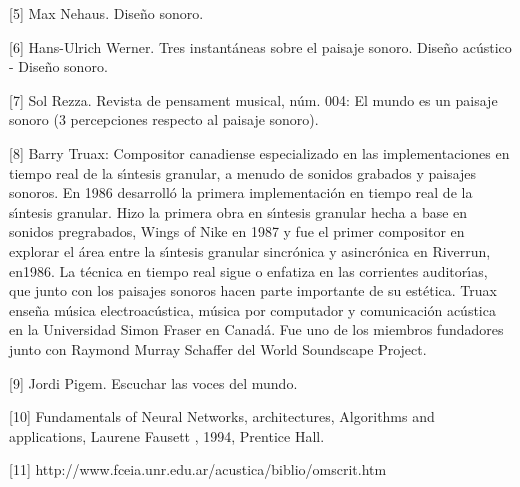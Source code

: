 [5] Max Nehaus. Dise\~{n}o sonoro.

[6] Hans-Ulrich Werner. Tres instant\'{a}neas sobre el paisaje sonoro.
Dise\~{n}o ac\'{u}stico - Dise\~{n}o sonoro.

[7] Sol Rezza. Revista de pensament musical, n\'{u}m. 004: El mundo es un
paisaje sonoro (3 percepciones respecto al paisaje sonoro).

[8] Barry Truax: Compositor canadiense especializado en las implementaciones
en tiempo real de la s\'{\i}ntesis granular, a menudo de sonidos grabados y
paisajes sonoros. En 1986 desarroll\'{o} la primera implementaci\'{o}n en
tiempo real de la s\'{\i}ntesis granular. Hizo la primera obra en
s\'{\i}ntesis granular hecha a base en sonidos pregrabados, Wings of Nike en
1987 y fue el primer compositor en explorar el \'{a}rea entre la s\'{\i}ntesis
granular sincr\'{o}nica y asincr\'{o}nica en Riverrun, en1986. La t\'{e}cnica
en tiempo real sigue o enfatiza en las corrientes auditor\'{\i}as, que junto
con los paisajes sonoros hacen parte importante de su est\'{e}tica. Truax
ense\~{n}a m\'{u}sica electroac\'{u}stica, m\'{u}sica por computador y
comunicaci\'{o}n ac\'{u}stica en la Universidad Simon Fraser en Canad\'{a}.
Fue uno de los miembros fundadores junto con Raymond Murray Schaffer del World
Soundscape Project.

[9] Jordi Pigem. Escuchar las voces del mundo.

[10] Fundamentals of Neural Networks, architectures, Algorithms and
applications, Laurene Fausett , 1994, Prentice Hall.\

[11] http://www.fceia.unr.edu.ar/acustica/biblio/omscrit.htm

\bigskip

\qquad

\qquad

\begin{center}
\bigskip
\end{center}


% 
